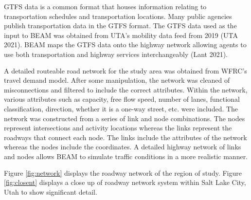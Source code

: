 \documentclass[12pt, oneside, openright]{byuthesis}
\begin{document}
GTFS data is a common format that houses information relating to transportation schedules and transportation locations. Many public agencies publish transportation data in the GTFS format. The GTFS data used as the input to BEAM was obtained from UTA's mobility data feed from 2019 (UTA 2021). BEAM maps the GTFS data onto the highway network allowing agents to use both transportation and highway services interchangeably (Lant 2021).

A detailed routeable road network for the study area was obtained from WFRC's travel demand model. After some manipulation, the network was cleaned of misconnections and filtered to include the correct attributes. Within the network, various attributes such as capacity, free flow speed, number of lanes, functional classification, direction, whether it is a one-way street, etc. were included. The network was constructed from a series of link and node combinations. The nodes represent intersections and activity locations whereas the links represent the roadways that connect each node. The links include the attributes of the network whereas the nodes include the coordinates. A detailed highway network of links and nodes allows BEAM to simulate traffic conditions in a more realistic manner.

Figure \ref{fig:network} displays the roadway network of the region of study. Figure \ref{fig:closent} displays a close up of roadway network system within Salt Lake City, Utah to show significant detail.
\end{document}
